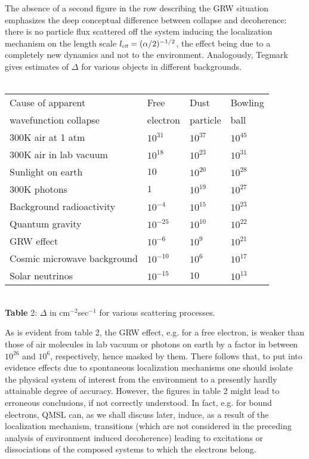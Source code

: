 \documentclass[10pt,a4paper]{article}
\begin{document}
The absence of a second figure in the row describing the GRW situation
emphasizes the deep conceptual difference between collapse and
decoherence: there is no particle flux scattered off  the system inducing
the localization mechanism on the length scale $l_{\makebox{\tiny
eff}} = (\alpha/2)^{-1/2}$, the effect being due to a completely
new dynamics and not to the environment. Analogously, Tegmark
gives estimates of $\Delta$ for various objects in different
backgrounds.
\\ \\ \begin{center}
\begin{tabular}{||l|lll||} \hline
Cause of apparent & Free & Dust & Bowling \\
wavefunction collapse & electron & particle & ball \\ \hline
300K air at 1 atm  & $10^{31}$ & $10^{37}$ & $10^{45}$ \\
300K air in lab vacuum  & $10^{18}$ & $10^{23}$ & $10^{31}$ \\
Sunlight on earth  & $10$ & $10^{20}$ & $10^{28}$ \\
300K photons  & $1$ & $10^{19}$ & $10^{27}$ \\
Background radioactivity  & $10^{-4}$ & $10^{15}$ & $10^{23}$ \\
Quantum gravity  & $10^{-25}$ & $10^{10}$ & $10^{22}$ \\
\hline
GRW effect  & $10^{-6}$ & $10^{9}$ & $10^{21}$ \\
\hline Cosmic microwave background  & $10^{-10}$ & $10^{6}$ &
$10^{17}$ \\
Solar neutrinos & $10^{-15}$ & $10$ & $10^{13}$ \\
\hline
\end{tabular}
\\ \vspace{.3cm}
{\small {\bf Table} 2: $\Delta$ in cm${}^{-2}$sec${}^{-1}$ for
various scattering processes.}
\end{center}

As is evident from table 2, the GRW effect, e.g. for a free
electron, is weaker than those of air molecules in lab vacuum or
photons on earth by a factor in between $10^{26}$ and $10^{6}$,
respectively, hence masked by them.
There follows that, to put into evidence effects due to spontaneous
localization mechanisms one should isolate the physical system of
interest from the environment to a presently hardly attainable
degree of accuracy.
However, the figures in table 2 might lead to erroneous
conclusions, if not correctly understood. In fact, e.g. for bound
electrons, QMSL can, as we shall discuss later, induce, as a
result of the localization mechanism, transitions (which are not
considered in the preceding analysis of environment induced
decoherence) leading to excitations or dissociations of the
composed systems to which the electrons belong.
\end{document}

